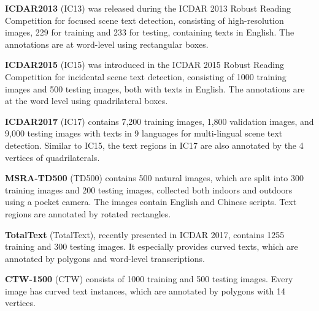 \documentclass[10pt,twocolumn,letterpaper]{article}
\begin{document}
\noindent\textbf{ICDAR2013} (IC13) was released during the ICDAR 2013 Robust Reading Competition for focused scene text detection, consisting of high-resolution images, 229 for training and 233 for testing, containing texts in English. The annotations are at word-level using rectangular boxes.



\noindent\textbf{ICDAR2015} (IC15) was introduced in the ICDAR 2015 Robust Reading Competition for incidental scene text detection, consisting of 1000 training images and 500 testing images, both with texts in English. The annotations are at the word level using quadrilateral boxes.



\noindent\textbf{ICDAR2017} (IC17) contains 7,200 training images, 1,800 validation images, and 9,000 testing images with texts in 9 languages for multi-lingual scene text detection. Similar to IC15, the text regions in IC17 are also annotated by the 4 vertices of quadrilaterals.



\noindent\textbf{MSRA-TD500} (TD500) contains 500 natural images, which are split into 300 training images and 200 testing images, collected both indoors and outdoors using a pocket camera. The images contain English and Chinese scripts. Text regions are annotated by rotated rectangles.

\noindent\textbf{TotalText} (TotalText), recently presented in ICDAR 2017, contains 1255 training and 300 testing images. It especially provides curved texts, which are annotated by polygons and word-level transcriptions.

\noindent\textbf{CTW-1500} (CTW) consists of 1000 training and 500 testing images. Every image has curved text instances, which are annotated by polygons with 14 vertices.
\end{document}
